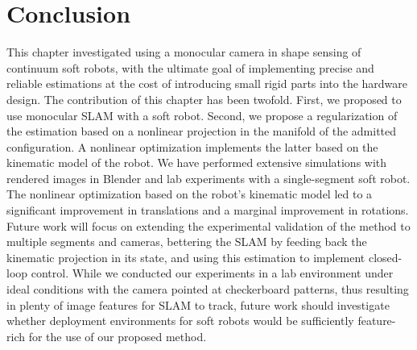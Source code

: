 \section{Conclusion}
\label{sec:srslam:conclusions}

This chapter investigated using a monocular camera in shape sensing of continuum soft robots, with the ultimate goal of implementing precise and reliable estimations at the cost of introducing small rigid parts into the hardware design. The contribution of this chapter has been twofold. First, we proposed to use monocular \gls{SLAM} with a soft robot. Second, we propose a regularization of the estimation based on a nonlinear projection in the manifold of the admitted configuration. A nonlinear optimization implements the latter based on the kinematic model of the robot. We have performed extensive simulations with rendered images in Blender and lab experiments with a single-segment soft robot. The nonlinear optimization based on the robot's kinematic model led to a significant improvement in translations and a marginal improvement in rotations. 
Future work will focus on extending the experimental validation of the method to multiple segments and cameras, bettering the SLAM by feeding back the kinematic projection in its state, and using this estimation to implement closed-loop control.
While we conducted our experiments in a lab environment under ideal conditions with the camera pointed at checkerboard patterns, thus resulting in plenty of image features for \gls{SLAM} to track, future work should investigate whether deployment environments for soft robots would be sufficiently feature-rich for the use of our proposed method.
